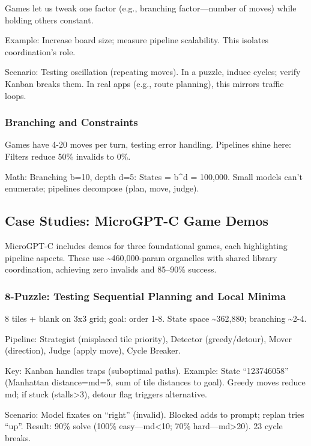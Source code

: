 \documentclass[
]{article}
\begin{document}
Games let us tweak one factor (e.g., branching factor---number of moves)
while holding others constant.

Example: Increase board size; measure pipeline scalability. This
isolates coordination's role.

Scenario: Testing oscillation (repeating moves). In a puzzle, induce
cycles; verify Kanban breaks them. In real apps (e.g., route planning),
this mirrors traffic loops.

\subsubsection{Branching and
Constraints}\label{branching-and-constraints}

Games have 4-20 moves per turn, testing error handling. Pipelines shine
here: Filters reduce 50\% invalids to 0\%.

Math: Branching b=10, depth d=5: States = b\^{}d = 100,000. Small models
can't enumerate; pipelines decompose (plan, move, judge).

\subsection{Case Studies: MicroGPT-C Game
Demos}\label{case-studies-microgpt-c-game-demos}

MicroGPT-C includes demos for three foundational games, each
highlighting pipeline aspects. These use \textasciitilde460,000-param
organelles with shared library coordination, achieving zero invalids and
85--90\% success.

\subsubsection{8-Puzzle: Testing Sequential Planning and Local
Minima}\label{puzzle-testing-sequential-planning-and-local-minima}

8 tiles + blank on 3x3 grid; goal: order 1-8. State space
\textasciitilde362,880; branching \textasciitilde2-4.

Pipeline: Strategist (misplaced tile priority), Detector
(greedy/detour), Mover (direction), Judge (apply move), Cycle Breaker.

Key: Kanban handles traps (suboptimal paths). Example: State
``123746058'' (Manhattan distance=md=5, sum of tile distances to goal).
Greedy moves reduce md; if stuck (stalls\textgreater3), detour flag
triggers alternative.

Scenario: Model fixates on ``right'' (invalid). Blocked adds to prompt;
replan tries ``up''. Result: 90\% solve (100\% easy---md\textless10;
70\% hard---md\textgreater20). 23 cycle breaks.
\end{document}
